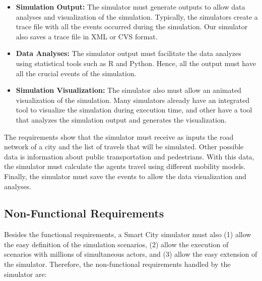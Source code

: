 \begin{itemize}
\item \textbf{Simulation Output: } The simulator must generate outputs to allow data analyses and visualization of the simulation. Typically, the simulators create a trace file with all the events occurred during the simulation. Our simulator also saves a trace file in XML or CVS format.

\item \textbf{Data Analyses: } The simulator output must facilitate the data analyzes using statistical tools such as R and Python. Hence, all the output must have all the crucial events of the simulation.

\item \textbf{Simulation Visualization: } The simulator also must allow an animated visualization of the simulation. Many simulators already have an integrated tool to visualize the simulation during execution time, and other have a tool that analyzes the simulation output and generates the visualization.

\end{itemize}

The requirements show that the simulator must receive as inputs the road network of a city and the list of travels that will be simulated. Other possible data is information about public transportation and pedestrians. With this data, the simulator must calculate the agents travel using different mobility models. Finally, the simulator must save the events to allow the data visualization and analyses.

\subsection{Non-Functional Requirements}
\label{sec:nonfunctional}

Besides the functional requirements, a Smart City simulator must also (1) allow the easy definition of the simulation scenarios, (2) allow the execution of scenarios with millions of simultaneous actors, and (3) allow the easy extension of the simulator. Therefore, the non-functional requirements handled by the simulator are:

